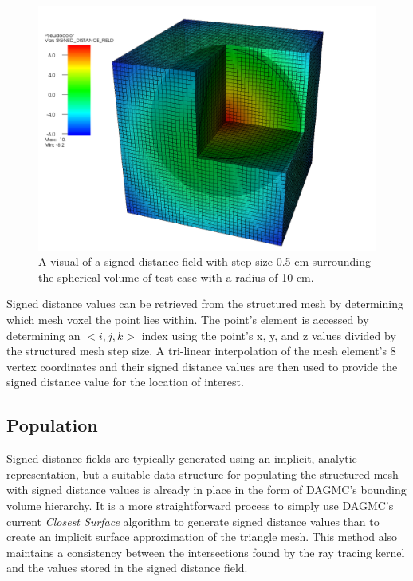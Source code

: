 \begin{figure}
  \centering
  \includegraphics[scale=0.3]{../images/sdf_sphere.png}
  \caption[Visualization of a signed distance field created in MOAB.]{A visual
    of a signed distance field with step size 0.5 cm surrounding the spherical
    volume of test case with a radius of 10 cm.}
  \label{fig:sdf_sphere}
\end{figure}

Signed distance values can be retrieved from the structured mesh by determining
which mesh voxel the point lies within. The point's element is accessed by
determining an $<i,j,k>$ index using the point's x, y, and z values divided by
the structured mesh step size. A tri-linear interpolation of the mesh element's 8
vertex coordinates and their signed distance values are then used to provide the
signed distance value for the location of interest.

\subsection{Population}

Signed distance fields are typically generated using an implicit, analytic
representation, but a suitable data structure for populating the structured mesh
with signed distance values is already in place in the form of DAGMC's bounding
volume hierarchy. It is a more straightforward process to simply use DAGMC's
current \textit{Closest Surface} algorithm to generate signed distance values than to
create an implicit surface approximation of the triangle mesh. This method also
maintains a consistency between the intersections found by the ray tracing
kernel and the values stored in the signed distance field.

